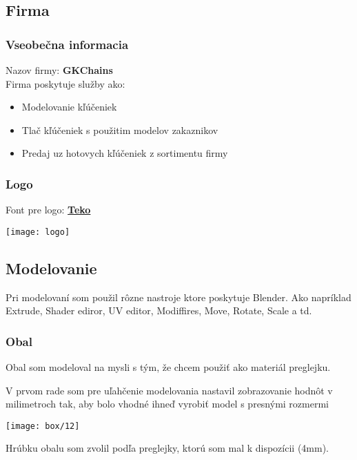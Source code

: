     \subsection{Firma}
      \subsubsection{Vseobečna informacia}
      Nazov firmy: \textbf{GKChains} \\
      Firma poskytuje služby ako:
      \begin{itemize}
        \item{Modelovanie kľúčeniek}
        \item{Tlač kľúčeniek s použitim modelov zakaznikov}
        \item{Predaj uz hotovych kľúčeniek z sortimentu firmy}
      \end{itemize}
      \subsubsection{Logo}
      Font pre logo: \textbf{\href{https://fonts.google.com/specimen/Teko?query=Teko}{Teko}}

      \begin{center}
        \texttt{[image: logo]}
      \end{center}

    \subsection{Modelovanie}
      Pri modelovaní som použil rôzne nastroje ktore poskytuje Blender. Ako napríklad Extrude, Shader ediror, UV editor, Modiffires, Move, Rotate, Scale a td.

      \subsubsection{Obal}
        Obal som modeloval na mysli s tým, že chcem použiť ako materiál preglejku.

        V prvom rade som pre uľahčenie modelovania nastavil zobrazovanie hodnôt v milimetroch tak, aby bolo vhodné ihneď vyrobiť model s presnými rozmermi \\

        \begin{center}
          \texttt{[image: box/12]}
        \end{center}

        Hrúbku obalu som zvolil podľa preglejky, ktorú som mal k dispozícii (4mm). \\

